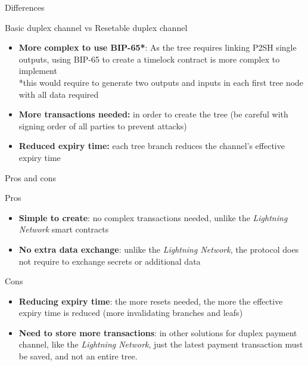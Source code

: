 \documentclass{beamer}
\begin{document}
\begin{frame}{Differences}
 \begin{block}{Basic duplex channel vs Resetable duplex channel}
  \begin{itemize}
   \item \textbf{More complex to use BIP-65*}: As the tree requires linking P2SH single outputs, using BIP-65 to create a timelock contract is more complex to implement\\

         \small{*this would require to generate two outputs and inputs in each first tree node with all data required}

   \item \textbf{More transactions needed:} in order to create the tree (be careful with signing order of all parties to prevent attacks)
   \item \textbf{Reduced expiry time:} each tree branch reduces the channel's effective expiry time
  \end{itemize}
 \end{block}
\end{frame}
\begin{frame}{Pros and cons}
 \begin{exampleblock}{Pros}
  \begin{itemize}
   \item \textbf{Simple to create}: no complex transactions needed, unlike the \textit{Lightning Network} smart contracts
   \item \textbf{No extra data exchange}: unlike the \textit{Lightning Network}, the protocol does not require to exchange secrets or additional data
  \end{itemize}
 \end{exampleblock}
 \begin{alertblock}{Cons}
  \begin{itemize}
   \item \textbf{Reducing expiry time}: the more resets needed, the more the effective expiry time is reduced (more invalidating branches and leafs)
   \item \textbf{Need to store more transactions}: in other solutions for duplex payment channel, like the \textit{Lightning Network}, just the latest payment transaction must be saved, and not an entire tree.
  \end{itemize}
 \end{alertblock}
\end{frame}
\end{document}
